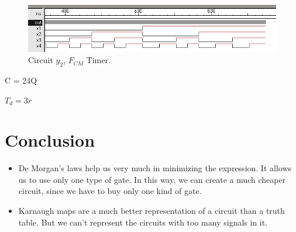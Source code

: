 \documentclass{article}
\begin{document}
			\begin{center} \begin{figure}[!ht]
				\begin{mdframed} \begin{center}
					\includegraphics[scale=0.4]{./imgs/Circuit1_FCM_ex2_timer.jpg}
					\caption{Circuit $y_2$, $F_{CM}$ Timer.}
				\end{center} \end{mdframed}
				\label{fig:circuit_y2_fcm_timer}
			\end{figure} \end{center}

			\begin{center}
				\par C = 24Q
				\par $T_d = 3r$
			\end{center}
			\pagebreak

	\newpage
	\section{Conclusion} %
		\begin{itemize}
			\item De Morgan's laws help us very much in minimizing the expression. It allows us to use only one type of gate. In this way, we can create a much cheaper circuit, since we have to buy only one kind of gate.

			\item Karnaugh maps are a much better representation of a circuit than a truth table. But we can't represent the circuits with too many signals in it.
		\end{itemize}
\end{document}
